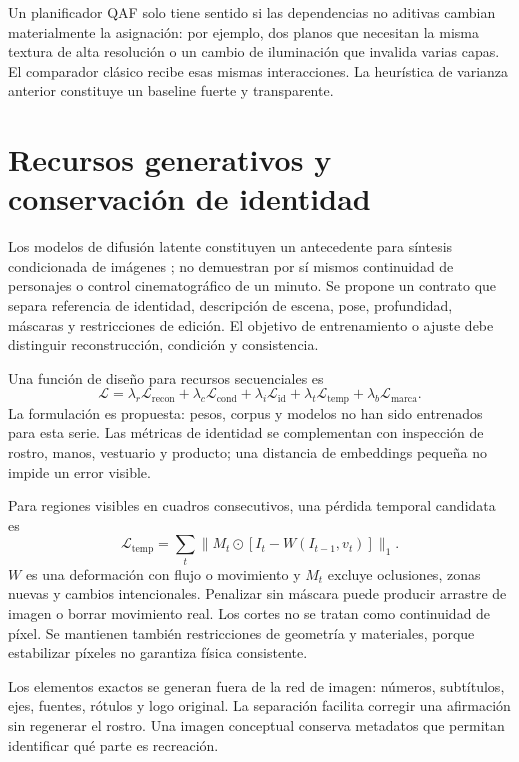 Un planificador QAF solo tiene sentido si las dependencias no aditivas cambian materialmente la asignación: por ejemplo, dos planos que necesitan la misma textura de alta resolución o un cambio de iluminación que invalida varias capas. El comparador clásico recibe esas mismas interacciones. La heurística de varianza anterior constituye un baseline fuerte y transparente.

\section{Recursos generativos y conservación de identidad}
Los modelos de difusión latente constituyen un antecedente para síntesis condicionada de imágenes \cite{ldm}; no demuestran por sí mismos continuidad de personajes o control cinematográfico de un minuto. Se propone un contrato que separa referencia de identidad, descripción de escena, pose, profundidad, máscaras y restricciones de edición. El objetivo de entrenamiento o ajuste debe distinguir reconstrucción, condición y consistencia.

Una función de diseño para recursos secuenciales es
\begin{equation}
 \mathcal L=\lambda_r\mathcal L_{\mathrm{recon}}+
 \lambda_c\mathcal L_{\mathrm{cond}}+\lambda_i\mathcal L_{\mathrm{id}}+
 \lambda_t\mathcal L_{\mathrm{temp}}+\lambda_b\mathcal L_{\mathrm{marca}}.
\end{equation}
La formulación es propuesta: pesos, corpus y modelos no han sido entrenados para esta serie. Las métricas de identidad se complementan con inspección de rostro, manos, vestuario y producto; una distancia de embeddings pequeña no impide un error visible.

Para regiones visibles en cuadros consecutivos, una pérdida temporal candidata es
\begin{equation}
 \mathcal L_{\mathrm{temp}}=\sum_t\|M_t\odot[I_t-W(I_{t-1},v_t)]\|_1.
\end{equation}
$W$ es una deformación con flujo o movimiento y $M_t$ excluye oclusiones, zonas nuevas y cambios intencionales. Penalizar sin máscara puede producir arrastre de imagen o borrar movimiento real. Los cortes no se tratan como continuidad de píxel. Se mantienen también restricciones de geometría y materiales, porque estabilizar píxeles no garantiza física consistente.

Los elementos exactos se generan fuera de la red de imagen: números, subtítulos, ejes, fuentes, rótulos y logo original. La separación facilita corregir una afirmación sin regenerar el rostro. Una imagen conceptual conserva metadatos que permitan identificar qué parte es recreación.

